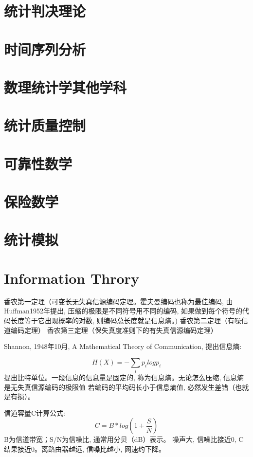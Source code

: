 \documentclass[UTF8]{../09-Mathematics}
\begin{document}
\chapter{统计判决理论}
\chapter{时间序列分析}
\chapter{数理统计学其他学科}

\chapter{统计质量控制}
\chapter{可靠性数学}
\chapter{保险数学}
\chapter{统计模拟}



\chapter{Information Throry}



香农第一定理（可变长无失真信源编码定理。霍夫曼编码也称为最佳编码, 由Huffman1952年提出, 压缩的极限是不同符号用不同的编码, 如果做到每个符号的代码长度等于它出现概率的对数, 则编码总长度就是信息熵。)
香农第二定理（有噪信道编码定理）
香农第三定理（保失真度准则下的有失真信源编码定理）

Shannon, 1948年10月, A Mathematical Theory of Communication, 提出信息熵: 

\begin{equation}
    H(X) = - \sum_i p_i logp_i
\end{equation}
提出比特单位。一段信息的信息量是固定的, 称为信息熵。无论怎么压缩, 信息熵是无失真信源编码的极限值
若编码的平均码长小于信息熵值, 必然发生差错（也就是有损）。


信道容量C计算公式: 
\begin{equation}
    C = B * log(1+ \frac{S}{N})
\end{equation}
B为信道带宽；S/N为信噪比, 通常用分贝（dB）表示。
噪声大, 信噪比接近0, C结果接近0。离路由器越远, 信噪比越小, 网速约下降。
\end{document}
